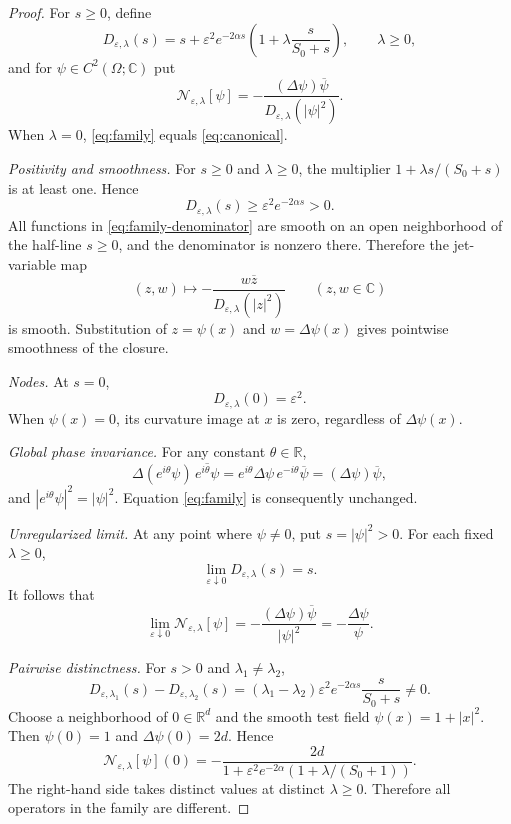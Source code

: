 \documentclass[11pt]{article}
\theoremstyle{remark}
\newcommand{\NN}[1]{\mathcal{N}_{\varepsilon,#1}}
\newcommand{\R}{\mathbb{R}}
\newcommand{\C}{\mathbb{C}}
\begin{document}
\begin{proof}
For $s\geq0$, define
\begin{equation}\label{eq:family-denominator}
D_{\varepsilon,\lambda}(s)
=s+\varepsilon^2e^{-2\alpha s}
  \left(1+\lambda\frac{s}{S_0+s}\right),
\qquad \lambda\geq0,
\end{equation}
and for $\psi\in C^2(\Omega;\C)$ put
\begin{equation}\label{eq:family}
\NN{\lambda}[\psi]
=-\frac{(\Delta\psi)\overline\psi}
       {D_{\varepsilon,\lambda}(|\psi|^2)}.
\end{equation}
When $\lambda=0$, \eqref{eq:family} equals \eqref{eq:canonical}.

\emph{Positivity and smoothness.}
For $s\geq0$ and $\lambda\geq0$, the multiplier
$1+\lambda s/(S_0+s)$ is at least one. Hence
\[
D_{\varepsilon,\lambda}(s)
\geq \varepsilon^2e^{-2\alpha s}>0.
\]
All functions in \eqref{eq:family-denominator} are smooth on an open
neighborhood of the half-line $s\geq0$, and the denominator is nonzero
there. Therefore the jet-variable map
\[
(z,w)\longmapsto
-\frac{w\overline z}{D_{\varepsilon,\lambda}(|z|^2)}
\qquad (z,w\in\C)
\]
is smooth. Substitution of $z=\psi(x)$ and $w=\Delta\psi(x)$ gives
pointwise smoothness of the closure.

\emph{Nodes.}
At $s=0$,
\[
D_{\varepsilon,\lambda}(0)=\varepsilon^2.
\]
When $\psi(x)=0$, its curvature image at $x$ is zero, regardless of
$\Delta\psi(x)$.

\emph{Global phase invariance.}
For any constant $\theta\in\R$,
\[
\Delta(e^{i\theta}\psi)\,
\overline{e^{i\theta}\psi}
=e^{i\theta}\Delta\psi\,e^{-i\theta}\overline\psi
=(\Delta\psi)\overline\psi,
\]
and $|e^{i\theta}\psi|^2=|\psi|^2$. Equation
\eqref{eq:family} is consequently unchanged.

\emph{Unregularized limit.}
At any point where $\psi\neq0$, put $s=|\psi|^2>0$. For each fixed
$\lambda\geq0$,
\[
\lim_{\varepsilon\downarrow0}D_{\varepsilon,\lambda}(s)=s.
\]
It follows that
\[
\lim_{\varepsilon\downarrow0}\NN{\lambda}[\psi]
=-\frac{(\Delta\psi)\overline\psi}{|\psi|^2}
=-\frac{\Delta\psi}{\psi}.
\]

\emph{Pairwise distinctness.}
For $s>0$ and $\lambda_1\neq\lambda_2$,
\begin{equation}\label{eq:difference}
D_{\varepsilon,\lambda_1}(s)
-D_{\varepsilon,\lambda_2}(s)
=(\lambda_1-\lambda_2)\varepsilon^2e^{-2\alpha s}
  \frac{s}{S_0+s}\neq0.
\end{equation}
Choose a neighborhood of $0\in\R^d$ and the smooth test field
$\psi(x)=1+|x|^2$. Then
$\psi(0)=1$ and $\Delta\psi(0)=2d$. Hence
\begin{equation}\label{eq:distinct}
\NN{\lambda}[\psi](0)
=-\frac{2d}
{1+\varepsilon^2e^{-2\alpha}
 \left(1+\lambda/(S_0+1)\right)}.
\end{equation}
The right-hand side takes distinct values at distinct $\lambda\geq0$.
Therefore all operators in the family are different.
\end{proof}
\end{document}
